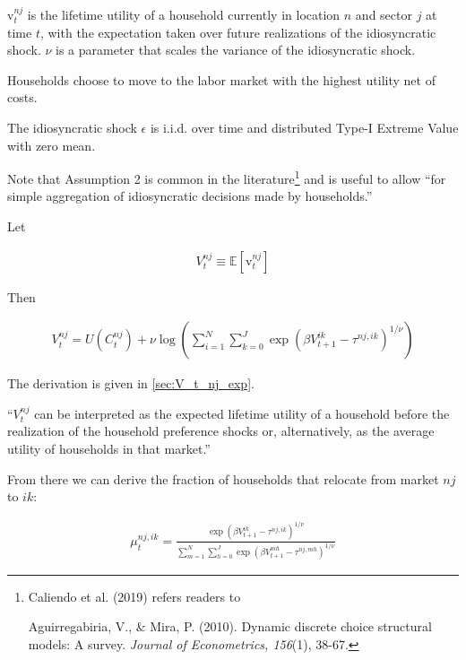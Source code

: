 \documentclass[10pt]{article}
\begin{document}
$\mathrm{v}_t^{n j}$ is the lifetime utility of a 
household currently in location $n$ and sector $j$ at time $t$, with 
the expectation taken over future realizations of the idiosyncratic shock. 
$\nu$ is a parameter that scales the variance of the idiosyncratic shock.

Households choose to move to the labor market 
with the highest utility net of costs.

\begin{notes}[Assumption 2]
    The idiosyncratic shock $\epsilon$ is i.i.d. over time 
    and distributed Type-I Extreme Value with zero mean.
\end{notes}

Note that Assumption 2 is common in the literature\footnote{Caliendo et al. (2019)
refers readers to 

Aguirregabiria, V., \& Mira, P. (2010). Dynamic discrete choice structural models: A survey. \emph{Journal of Econometrics, 156}(1), 38-67.} 
and is useful to allow ``for 
simple aggregation of idiosyncratic decisions 
made by households.''

Let

\begin{align}
    V_t^{n j} \equiv \mathbb{E}\left[\mathrm{v}_t^{n j}\right] \label{eq:V_t_nj_init}
\end{align}

Then 

\begin{align}
    V_t^{n j}=U\left(C_t^{n j}\right)+\nu \log \left(\sum_{i=1}^N \sum_{k=0}^J \exp \left(\beta V_{t+1}^{i k}-\tau^{n j, i k}\right)^{1 / \nu}\right) \label{eq:V_t_nj_exp}
\end{align}

The derivation is given in \autoref{sec:V_t_nj_exp}.

``$V_t^{n j}$ can be interpreted as the expected lifetime 
utility of a household before the realization of the 
household preference shocks or, alternatively, as the 
average utility of households in that market.''

From there we can derive the fraction of households 
that relocate from market $nj$ to $ik$:

\begin{align}
    \mu_t^{n j, i k}=\frac{\exp \left(\beta V_{t+1}^{i k}-\tau^{n j, i k}\right)^{1 / \nu}}{\sum_{m=1}^N \sum_{h=0}^J \exp \left(\beta V_{t+1}^{m h}-\tau^{n j, m h}\right)^{1 / \nu}} \label{eq:mu_t_nj_ik}
\end{align}
\end{document}

